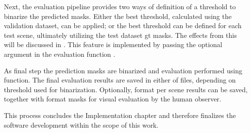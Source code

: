 {Next, the evaluation pipeline provides two ways of definition of a threshold to binarize the predicted masks.
Either the best threshold, calculated using the validation dataset, can be applied; or the best threshold can be defined for each test scene,
ultimately utilizing the test dataset \gls{gt} masks. The effects from this will be discussed in .
This feature is implemented by passing the optional argument  in the evaluation function .

As final step the prediction masks are binarized and evaluation performed using  function.
The final evaluation results are saved in either  of  files, depending on threshold used for binarization.
Optionally,  format per scene results can be saved, together with  format masks for visual evaluation by the human observer.

\vfill

This process concludes the Implementation chapter and therefore finalizes the software development within the scope of this work.

}